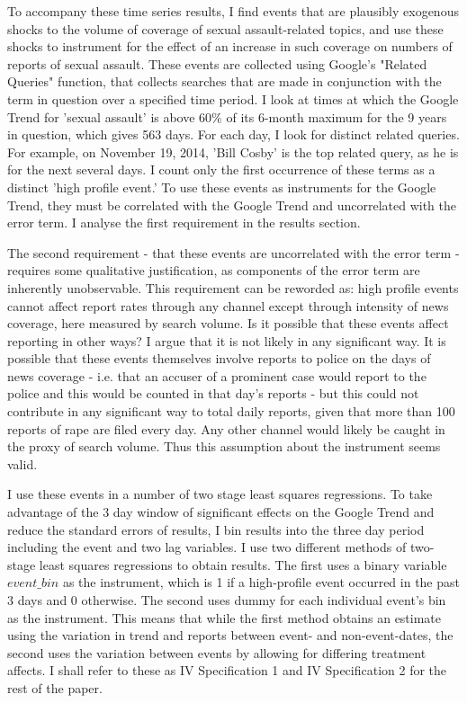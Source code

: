 \documentclass[AER,draftmode]{AEA}
\begin{document}
To accompany these time series results, I find events that are plausibly exogenous shocks to the volume of coverage of sexual assault-related topics, and use these shocks to instrument for the effect of an increase in such coverage on numbers of reports of sexual assault. These events are collected using Google's "Related Queries" function, that collects searches that are made in conjunction with the term in question over a specified time period. I look at times at which the Google Trend for 'sexual assault' is above 60\% of its 6-month maximum for the 9 years in question, which gives 563 days. For each day, I look for distinct related queries. For example, on November 19, 2014, 'Bill Cosby' is the top related query, as he is for the next several days. I count only the first occurrence of these terms as a distinct 'high profile event.' To use these events as instruments for the Google Trend, they must be correlated with the Google Trend and uncorrelated with the error term. I analyse the first requirement in the results section. 

The second requirement - that these events are uncorrelated with the error term - requires some qualitative justification, as components of the error term are inherently unobservable. This requirement can be reworded as: high profile events cannot affect report rates through any channel except through intensity of news coverage, here measured by search volume. Is it possible that these events affect reporting in other ways? I argue that it is not likely in any significant way. It is possible that these events themselves involve reports to police on the days of news coverage - i.e. that an accuser of a prominent case would report to the police and this would be counted in that day's reports - but this could not contribute in any significant way to total daily reports, given that more than 100 reports of rape are filed every day. Any other channel would likely be caught in the proxy of search volume. Thus this assumption about the instrument seems valid.

I use these events in a number of two stage least squares regressions. To take advantage of the 3 day window of significant effects on the Google Trend and reduce the standard errors of results, I bin results into the three day period including the event and two lag variables. I use two different methods of two-stage least squares regressions to obtain results. The first uses a binary variable $event\_bin$ as the instrument, which is 1 if a high-profile event occurred in the past 3 days and 0 otherwise. The second uses dummy for each individual event's bin as the instrument. This means that while the first method obtains an estimate using the variation in trend and reports between event- and non-event-dates, the second uses the variation between events by allowing for differing treatment affects. I shall refer to these as IV Specification 1 and IV Specification 2 for the rest of the paper.
\end{document}
